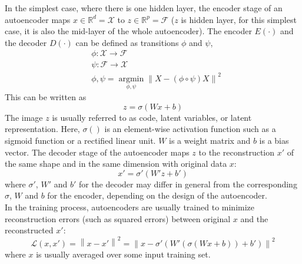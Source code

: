 \documentclass[12pt]{report} %
\newcommand{\norm}[1]{\left\lVert #1 \right\rVert}
\begin{document}
In the simplest case, where there is one hidden layer, the encoder stage of an autoencoder maps \(x\in \mathbb{R}^{d}=\mathcal{X}\) to \(z\in \mathbb{R}^{p}=\mathcal{F}\) ($z$ is hidden layer, for this simplest case, it is also the mid-layer of the whole autoencoder). The encoder \(E(\cdot)\) and the decoder \(D(\cdot)\) can be defined as transitions $\phi$ and $\psi$,
\begin{equation}
\begin{split}
& \phi:\mathcal{X}\to\mathcal{F} \\
& \psi:\mathcal{F}\to\mathcal{X} \\
& \phi,\psi=\operatorname*{argmin}_{\phi,\psi} \norm{X-(\phi \circ \psi)X}^2
\end{split}
\end{equation}
This can be written as
\begin{equation}
z=\sigma(Wx+b)
\end{equation}
The image $z$ is usually referred to as code, latent variables, or latent representation. Here, $\sigma()$ is an element-wise activation function such as a sigmoid function or a rectified linear unit. $W$ is a weight matrix and $b$ is a bias vector. The decoder stage of the autoencoder maps $z$ to the reconstruction $x'$  of the same shape and in the same dimension with original data $x$:
\begin{equation}
x'=\sigma'(W'z+b')
\end{equation}
where $\sigma'$, $W'$ and $b'$ for the decoder may differ in general from the corresponding $\sigma$, $W$ and $b$ for the encoder, depending on the design of the autoencoder.\\
In the training process, autoencoders are usually trained to minimize reconstruction errors (such as squared errors) between original $x$ and the reconstructed $x'$:
\begin{equation}
\mathcal{L}(x,x')=\norm{x-x'}^2=\norm{x-\sigma'(W'(\sigma(Wx+b))+b')}^2
\end{equation}
where $x$ is usually averaged over some input training set\cite{AE}.
\end{document}
